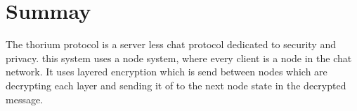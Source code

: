 \section*{Summay}

The thorium protocol is a server less chat protocol dedicated to security and privacy.
this system uses a node system, where every client is a node in the chat network. It uses layered encryption which is send between nodes which are decrypting each layer and sending it of to the next node state in the decrypted message.
